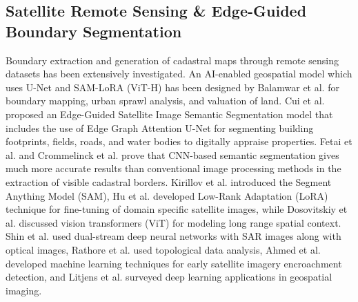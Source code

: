 \documentclass[conference]{IEEEtran}
\begin{document}
\subsection{Satellite Remote Sensing \& Edge-Guided Boundary Segmentation}
Boundary extraction and generation of cadastral maps through remote sensing datasets has been extensively investigated. An AI-enabled geospatial model which uses U-Net and SAM-LoRA (ViT-H) has been designed by Balamwar et al. \cite{balamwar2024} for boundary mapping, urban sprawl analysis, and valuation of land. Cui et al. \cite{cui2024} proposed an Edge-Guided Satellite Image Semantic Segmentation model that includes the use of Edge Graph Attention U-Net for segmenting building footprints, fields, roads, and water bodies to digitally appraise properties. Fetai et al. \cite{fetai2021} and Crommelinck et al. \cite{crommelinck2019} prove that CNN-based semantic segmentation gives much more accurate results than conventional image processing methods in the extraction of visible cadastral borders. Kirillov et al. \cite{kirillov2023} introduced the Segment Anything Model (SAM), Hu et al. \cite{hu2021} developed Low-Rank Adaptation (LoRA) technique for fine-tuning of domain specific satellite images, while Dosovitskiy et al. \cite{dosovitskiy2021} discussed vision transformers (ViT) for modeling long range spatial context. Shin et al. \cite{shin2023} used dual-stream deep neural networks with SAR images along with optical images, Rathore et al. \cite{rathore2024} used topological data analysis, Ahmed et al. \cite{ahmed2022} developed machine learning techniques for early satellite imagery encroachment detection, and Litjens et al. \cite{litjens2017} surveyed deep learning applications in geospatial imaging.
\end{document}
